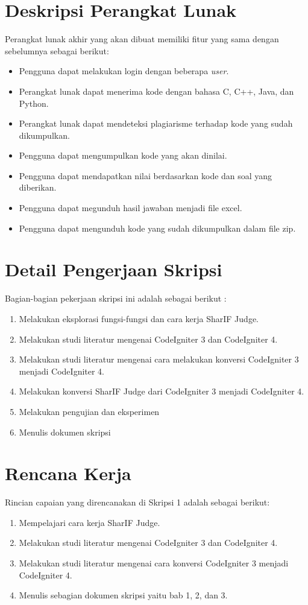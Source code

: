 \documentclass[a4paper,twoside]{article}
\begin{document}
\section{Deskripsi Perangkat Lunak}
Perangkat lunak akhir yang akan dibuat memiliki fitur yang sama dengan sebelumnya sebagai berikut:
\begin{itemize}
	\item Pengguna dapat melakukan login dengan beberapa \textit{user}.
	\item Perangkat lunak dapat menerima kode dengan bahasa C, C++, Java, dan Python. 
	\item Perangkat lunak dapat mendeteksi plagiarisme terhadap kode yang sudah dikumpulkan.
	\item Pengguna dapat mengumpulkan kode yang akan dinilai.
	\item Pengguna dapat mendapatkan nilai berdasarkan kode dan soal yang diberikan.
	\item Pengguna dapat megunduh hasil jawaban menjadi file excel.
	\item Pengguna dapat mengunduh kode yang sudah dikumpulkan dalam file zip.	
\end{itemize}

\section{Detail Pengerjaan Skripsi}
Bagian-bagian pekerjaan skripsi ini adalah sebagai berikut :
	\begin{enumerate}
		\item Melakukan eksplorasi fungsi-fungsi dan cara kerja SharIF Judge. 
		\item Melakukan studi literatur mengenai CodeIgniter 3 dan CodeIgniter 4.
		\item Melakukan studi literatur mengenai cara melakukan konversi CodeIgniter 3 menjadi CodeIgniter 4.
		\item Melakukan konversi SharIF Judge dari CodeIgniter 3 menjadi CodeIgniter 4.
		\item Melakukan pengujian dan eksperimen
		\item Menulis dokumen skripsi
	\end{enumerate}

\section{Rencana Kerja}
Rincian capaian yang direncanakan di Skripsi 1 adalah sebagai berikut:
\begin{enumerate}
\item Mempelajari cara kerja SharIF Judge.
\item Melakukan studi literatur mengenai CodeIgniter 3 dan CodeIgniter 4.
\item Melakukan studi literatur mengenai cara konversi CodeIgniter 3 menjadi CodeIgniter 4.
\item Menulis sebagian dokumen skripsi yaitu bab 1, 2, dan 3.
\end{enumerate}
\end{document}
